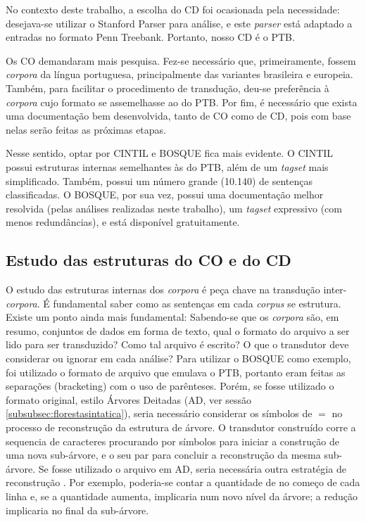No contexto deste trabalho, a escolha do CD foi ocasionada pela necessidade: desejava-se utilizar o Stanford Parser para análise, e este \textit{parser} está adaptado a entradas no formato Penn Treebank. Portanto, nosso CD é o PTB. 

Os CO demandaram mais pesquisa. Fez-se necessário que, primeiramente, fossem \textit{corpora} da língua portuguesa, principalmente das variantes brasileira e europeia. Também, para facilitar o procedimento de transdução, deu-se preferência à \textit{corpora} cujo formato se assemelhasse ao do PTB. Por fim, é necessário que exista uma documentação bem desenvolvida, tanto de CO como de CD, pois com base nelas serão feitas as próximas etapas.

Nesse sentido, optar por CINTIL e BOSQUE fica mais evidente. O CINTIL possui estruturas internas semelhantes às do PTB, além de um \textit{tagset} mais simplificado. Também, possui um número grande (10.140) de sentenças classificadas. O BOSQUE, por sua vez, possui uma documentação melhor resolvida (pelas análises realizadas neste trabalho), um \textit{tagset} expressivo (com menos redundâncias), e está disponível gratuitamente.

\subsection{Estudo das estruturas do CO e do CD}
\label{subsec:estruturas_corpora}

O estudo das estruturas internas dos \textit{corpora} é peça chave na transdução inter-\textit{corpora}. É fundamental saber como as sentenças em cada \textit{corpus} se estrutura. Existe um ponto ainda mais fundamental: Sabendo-se que os \textit{corpora} são, em resumo, conjuntos de dados em forma de texto, qual o formato do arquivo a ser lido para ser transduzido? Como tal arquivo é escrito? O que o transdutor deve considerar ou ignorar em cada análise? Para utilizar o BOSQUE como exemplo, foi utilizado o formato de arquivo que emulava o PTB, portanto eram feitas as separações (bracketing) com o uso de parênteses. Porém, se fosse utilizado o formato original, estilo Árvores Deitadas (AD, ver sessão \ref{subsubsec:florestasintatica}), seria necessário considerar os símbolos de $=$ no processo de reconstrução da estrutura de árvore. O transdutor construído corre a sequencia de caracteres procurando por símbolos  para iniciar a construção de uma nova sub-árvore, e o seu par  para concluir a reconstrução da mesma sub-árvore. Se fosse utilizado o arquivo em AD, seria necessária outra estratégia de reconstrução . Por exemplo, poderia-se contar a quantidade de \textquote{=} no começo de cada linha e, se a quantidade aumenta, implicaria num novo nível da árvore; a redução implicaria no final da sub-árvore.

